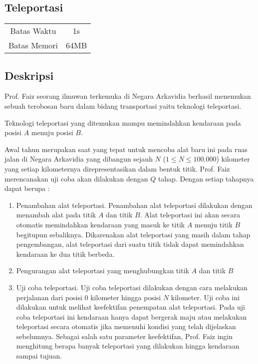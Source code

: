 \documentclass{article}
\begin{document}
\begin{center}
    \section*{Teleportasi} %

    \begin{tabular}{ | c c | }
        \hline
        Batas Waktu  & 1s \\    %
        Batas Memori & 64MB \\  %
        \hline
    \end{tabular}
\end{center}

\subsection*{Deskripsi}

Prof. Faiz seorang ilmuwan terkemuka di Negara Arkavidia berhasil menemukan sebuah terobosan baru dalam bidang transportasi yaitu teknologi teleportasi.

Teknologi teleportasi yang ditemukan mampu memindahkan kendaraan pada posisi $A$ menuju posisi $B$.

Awal tahun merupakan saat yang tepat untuk mencoba alat baru ini pada ruas jalan di Negara Arkavidia yang dibangun sejauh $N$ ($1 \leq N \leq 100.000$) kilometer yang setiap kilometernya direpresentasikan dalam bentuk titik. Prof. Faiz merencanakan uji coba akan dilakukan dengan $Q$ tahap. Dengan setiap tahapnya dapat berupa :

\begin{enumerate}
    \setlength\itemsep{0pt}
    \item  Penambahan alat teleportasi. Penambahan alat teleportasi dilakukan dengan menambah alat pada titik $A$ dan titik $B$. Alat teleportasi ini akan secara otomatis memindahkan kendaraan yang masuk ke titik $A$ menuju titik $B$ begitupun sebaliknya. Dikarenakan alat teleportasi yang masih dalam tahap pengembangan, alat teleportasi dari suatu titik tidak dapat memindahkan kendaraan ke dua titik berbeda.

    \item Pengurangan alat teleportasi yang menghubungkan titik $A$ dan titik $B$

    \item Uji coba teleportasi. Uji coba teleportasi dilakukan dengan cara melakukan perjalanan dari posisi $0$ kilometer hingga posisi $N$ kilometer. Uji coba ini dilakukan untuk melihat keefektifan penempatan alat teleportasi. Pada uji coba teleportasi ini kendaraan hanya dapat bergerak maju atau melakukan teleportasi secara otomatis jika memenuhi kondisi yang telah dijelaskan sebelumnya. Sebagai salah satu parameter keefektifan, Prof. Faiz ingin menghitung berapa banyak teleportasi yang dilakukan hingga kendaraan sampai tujuan.   
\end{enumerate}
\end{document}
